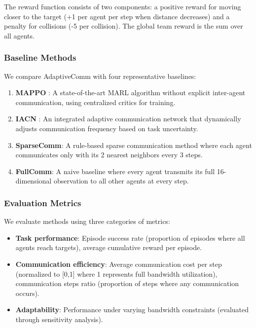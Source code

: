 \documentclass[10pt, twocolumn]{IEEEtran}
\begin{document}
The reward function consists of two components: a positive reward for moving closer to the target (+1 per agent per step when distance decreases) and a penalty for collisions (-5 per collision). The global team reward is the sum over all agents.

\subsubsection{Baseline Methods}
We compare AdaptiveComm with four representative baselines:
\begin{enumerate}
    \item \textbf{MAPPO} \cite{iqbal2019actor}: A state-of-the-art MARL algorithm without explicit inter-agent communication, using centralized critics for training.
    \item \textbf{IACN} \cite{ding2020adaptive}: An integrated adaptive communication network that dynamically adjusts communication frequency based on task uncertainty.
    \item \textbf{SparseComm}: A rule-based sparse communication method where each agent communicates only with its 2 nearest neighbors every 3 steps.
    \item \textbf{FullComm}: A naive baseline where every agent transmits its full 16-dimensional observation to all other agents at every step.
\end{enumerate}

\subsubsection{Evaluation Metrics}
We evaluate methods using three categories of metrics:
\begin{itemize}
    \item \textbf{Task performance}: Episode success rate (proportion of episodes where all agents reach targets), average cumulative reward per episode.
    \item \textbf{Communication efficiency}: Average communication cost per step (normalized to [0,1] where 1 represents full bandwidth utilization), communication steps ratio (proportion of steps where any communication occurs).
    \item \textbf{Adaptability}: Performance under varying bandwidth constraints (evaluated through sensitivity analysis).
\end{itemize}
\end{document}
